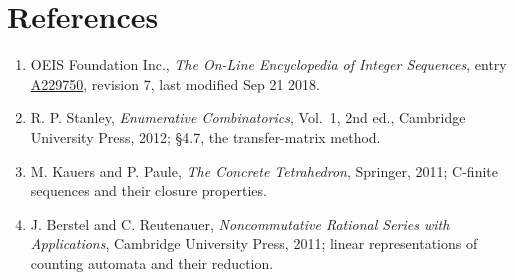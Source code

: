 \documentclass[11pt]{article}
\theoremstyle{definition}
\begin{document}
\section{References}

\begin{enumerate}

\item OEIS Foundation Inc., \emph{The On-Line Encyclopedia of Integer Sequences}, entry \href{https://oeis.org/A229750}{A229750}, revision 7, last modified Sep 21 2018.

\item R. P. Stanley, \emph{Enumerative Combinatorics}, Vol.~1, 2nd ed., Cambridge University Press, 2012; \S4.7, the transfer-matrix method.

\item M. Kauers and P. Paule, \emph{The Concrete Tetrahedron}, Springer, 2011; C-finite sequences and their closure properties.

\item J. Berstel and C. Reutenauer, \emph{Noncommutative Rational Series with Applications}, Cambridge University Press, 2011; linear representations of counting automata and their reduction.

\end{enumerate}
\end{document}
